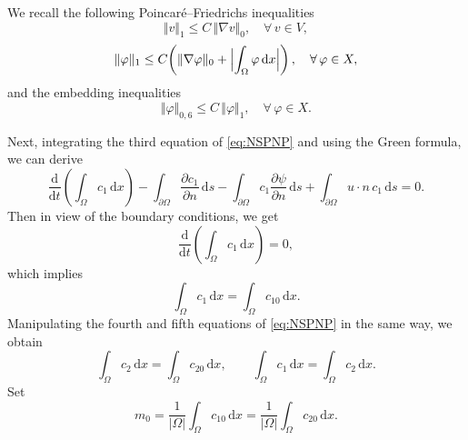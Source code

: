 \documentclass[a4paper,fleqn]{cas-sc}
\numberwithin{equation}{section}
\theoremstyle{definition}
\begin{document}
We recall the following Poincar\'{e}--Friedrichs inequalities
\begin{equation}
  \Vert v\Vert_{1} \le C\,\Vert\nabla v\Vert_{0},
  \quad \forall\,v\in V,
  \label{eq:2.5}
\end{equation}
\begin{equation}
  \Vert\varphi\Vert_{1}
  \le C\!\left(\Vert\nabla\varphi\Vert_{0}
    + \Bigl|\int_{\Omega}\varphi\,\mathrm{d}x\Bigr|\right),
  \quad \forall\,\varphi\in X,
  \label{eq:2.6}
\end{equation}
and the embedding inequalities
\begin{equation}
  \Vert\varphi\Vert_{0,6} \le C\,\Vert\varphi\Vert_{1},
  \quad \forall\,\varphi\in X.
  \label{eq:2.7}
\end{equation}

Next, integrating the third equation of \eqref{eq:NSPNP} and using the
Green formula, we can derive
\begin{equation}
  \frac{\mathrm{d}}{\mathrm{d}t}
  \!\left(\int_{\Omega}c_{1}\,\mathrm{d}x\right)
  - \int_{\partial\Omega}\frac{\partial c_{1}}{\partial n}\,\mathrm{d}s
  - \int_{\partial\Omega}c_{1}\frac{\partial\psi}{\partial n}\,\mathrm{d}s
  + \int_{\partial\Omega}u\cdot n\,c_{1}\,\mathrm{d}s = 0.
  \label{eq:2.8}
\end{equation}
Then in view of the boundary conditions, we get
\begin{equation}
  \frac{\mathrm{d}}{\mathrm{d}t}
  \!\left(\int_{\Omega}c_{1}\,\mathrm{d}x\right) = 0,
  \label{eq:2.9}
\end{equation}
which implies
\begin{equation}
  \int_{\Omega}c_{1}\,\mathrm{d}x = \int_{\Omega}c_{10}\,\mathrm{d}x.
  \label{eq:2.10}
\end{equation}
Manipulating the fourth and fifth equations of \eqref{eq:NSPNP} in the
same way, we obtain
\begin{equation}
  \int_{\Omega}c_{2}\,\mathrm{d}x = \int_{\Omega}c_{20}\,\mathrm{d}x,
  \qquad
  \int_{\Omega}c_{1}\,\mathrm{d}x = \int_{\Omega}c_{2}\,\mathrm{d}x.
  \label{eq:2.11}
\end{equation}
Set
\begin{equation}
  m_{0}
  = \frac{1}{|\Omega|}\int_{\Omega}c_{10}\,\mathrm{d}x
  = \frac{1}{|\Omega|}\int_{\Omega}c_{20}\,\mathrm{d}x.
  \label{eq:2.12}
\end{equation}
\end{document}
